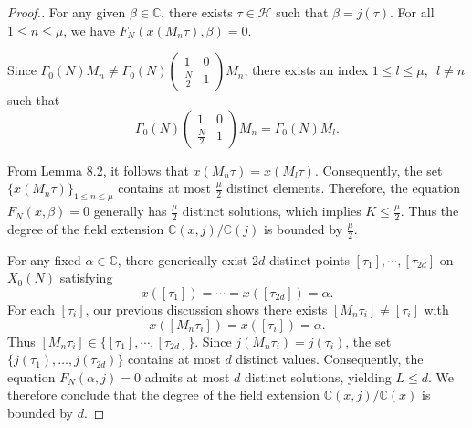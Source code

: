 \documentclass[10pt, a4paper]{article}
\begin{document}
\begin{proof}[Proof.]
For any given $\beta \in \mathbb{C}$, there exists $\tau \in \mathcal{H}$ such that $\beta = j(\tau)$.  For all $1 \leq n \leq \mu$, we have  $ F_N(x(M_n \tau), \beta) = 0. $

Since $\Gamma_0(N)M_n \neq \Gamma_0(N)\begin{pmatrix} 1 & 0 \\ \frac{N}{2} & 1 \end{pmatrix} M_n$,  there exists an index
$ 1 \leq l \leq \mu, \,\,\, l \neq n$
such that
\[ \Gamma_0(N)\begin{pmatrix} 1 & 0 \\ \frac{N}{2} & 1 \end{pmatrix} M_n = \Gamma_0(N)M_l. \]

From Lemma $8.2$,  it follows that $x(M_n \tau) = x(M_l \tau)$.  Consequently, the set $\{x(M_n \tau)\}_{1 \leq n \leq \mu}$ contains at most $\frac{\mu}{2}$ distinct elements. Therefore, the equation $F_N(x, \beta) = 0$ generally has $\frac{\mu}{2}$ distinct solutions, which implies  $ K \leq \frac{\mu}{2} $. Thus
 the degree of the field extension $\mathbb{C}(x, j)/\mathbb{C}(j)$ is bounded by $\frac{\mu}{2}$.

For any fixed $\alpha \in \mathbb{C}$, there generically exist $2d$ distinct points $[\tau_1], \cdots, [\tau_{2d}]$ on $X_0(N)$ satisfying
\[ x([\tau_1]) = \cdots = x([\tau_{2d}]) = \alpha. \]
For each $[\tau_i]$, our previous discussion shows there exists $[M_n \tau_i] \neq [\tau_i]$ with
\[ x([M_n \tau_i]) = x([\tau_i]) = \alpha. \]
Thus $[M_n \tau_i] \in \{[\tau_1], \cdots, [\tau_{2d}]\}$.
Since $j(M_n \tau_i) = j(\tau_i)$, the set $\{j(\tau_1), \dots, j(\tau_{2d})\}$ contains at most $d$ distinct values. Consequently, the equation $F_N(\alpha, j) = 0$ admits at most $d$ distinct solutions, yielding $L \leq d$. We therefore conclude that the degree of the field extension $\mathbb{C}(x, j)/\mathbb{C}(x)$ is bounded by $d$.
\end{proof}
\end{document}
